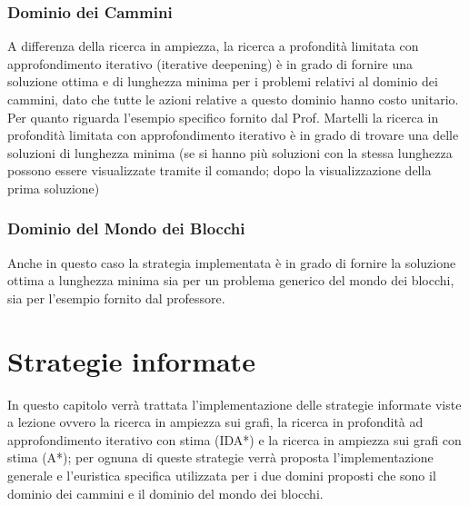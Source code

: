 \subsection{Dominio dei Cammini}
A differenza della ricerca in ampiezza, la ricerca a profondità limitata con approfondimento iterativo (iterative deepening) è in grado di fornire una soluzione ottima e di lunghezza minima per i problemi relativi al dominio dei cammini, dato che tutte le azioni relative a questo dominio hanno costo unitario. Per quanto riguarda l'esempio specifico fornito dal Prof. Martelli la ricerca in profondità limitata con approfondimento iterativo è in grado di trovare una delle soluzioni di lunghezza minima (se si hanno più soluzioni con la stessa lunghezza possono essere visualizzate tramite il comando; dopo la visualizzazione della prima soluzione)

\subsection{Dominio del Mondo dei Blocchi}
Anche in questo caso la strategia implementata è in grado di fornire la soluzione ottima a lunghezza minima sia per un problema generico del mondo dei blocchi, sia per l'esempio fornito dal professore.

\chapter{Strategie informate}
In questo capitolo verrà trattata l'implementazione delle strategie informate viste a lezione ovvero la ricerca in ampiezza sui grafi, la ricerca in profondità ad approfondimento iterativo con stima (IDA*) e la ricerca in ampiezza sui grafi con stima (A*); per ognuna di queste strategie verrà proposta l'implementazione generale e l'euristica specifica utilizzata per i due domini proposti che sono il dominio dei cammini e il dominio del mondo dei blocchi.

